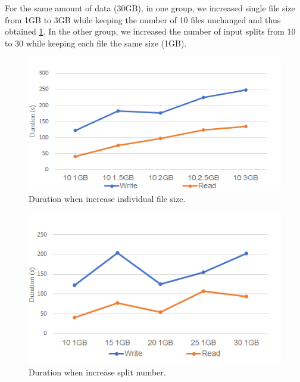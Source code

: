 \documentclass[11pt,twocolumn]{article}
\begin{document}
For the same amount of data (30GB), in one group, we increased single file size from 1GB to 3GB while keeping the number of 10 files unchanged and thus obtained \ref{fig:ds0}. In the other group, we increased the number of input splits from 10 to 30 while keeping each file the same size (1GB).
\begin{figure}[htp]
    \centering
        \includegraphics[width=\linewidth]{ds0}
        \caption{Duration when increase individual file size.}
        \label{fig:ds0}
\end{figure}
\begin{figure}[htp]
    \centering
        \includegraphics[width=\linewidth]{dn0}
        \caption{Duration when increase split number.}
        \label{fig:dn0}
\end{figure}
\end{document}
